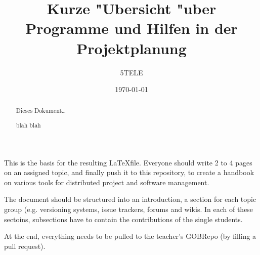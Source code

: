 \documentclass[a4paper]{article}
\begin{document}
\title{Kurze "Ubersicht "uber Programme und Hilfen in der Projektplanung}
\author{5TELE}
\date{\today}

\maketitle
\begin{abstract}
Dieses Dokument\ldots

blah blah
\end{abstract}

%


%









    This is the basis for the resulting \LaTeX file.
    Everyone should write 2 to 4 pages on an assigned topic, and finally push it to this repository, to create a handbook on various tools
    for distributed project and software management.
    
    The document should be structured into an introduction, a section for each topic group (e.g. versioning systems, issue trackers, forums and wikis.
    In each of these sectoins, subsections have to contain the contributions of the single students.

    At the end, everything needs to be pulled to the teacher's GOBRepo (by filling a pull request).
\end{document}
